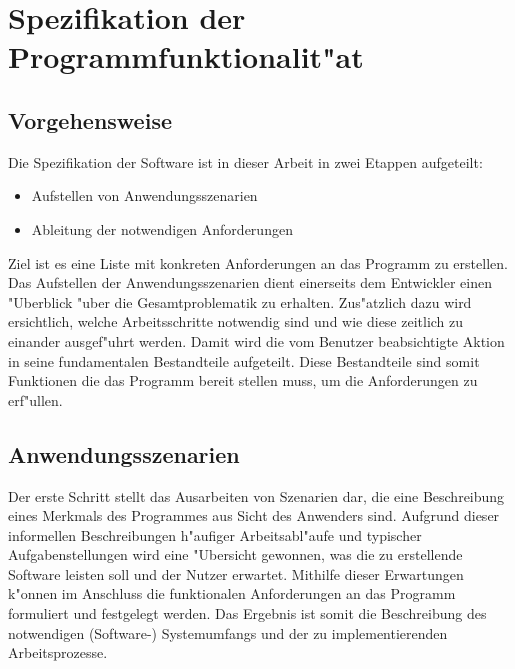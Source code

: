 \chapter{Spezifikation der Programmfunktionalit"at}
\label{chap:spezifikation}

\section{Vorgehensweise}

Die Spezifikation der Software ist in dieser Arbeit in zwei Etappen aufgeteilt:
\begin{itemize}
	\item Aufstellen von Anwendungsszenarien
	\item Ableitung der notwendigen Anforderungen
\end{itemize}
Ziel ist es eine Liste mit konkreten Anforderungen an das Programm zu erstellen.
Das Aufstellen der Anwendungsszenarien dient einerseits dem Entwickler einen "Uberblick "uber die Gesamtproblematik zu erhalten.
Zus"atzlich dazu wird ersichtlich, welche Arbeitsschritte notwendig sind und wie diese zeitlich zu einander ausgef"uhrt werden.
Damit wird die vom Benutzer beabsichtigte Aktion in seine fundamentalen Bestandteile aufgeteilt.
Diese Bestandteile sind somit Funktionen die das Programm bereit stellen muss, um die Anforderungen zu erf"ullen.

\section{Anwendungsszenarien}
\label{sec:anwendungsszenarien}


Der erste Schritt stellt das Ausarbeiten von Szenarien dar, die eine Beschreibung eines Merkmals des Programmes aus Sicht des Anwenders sind.
Aufgrund dieser informellen Beschreibungen h"aufiger Arbeitsabl"aufe und typischer Aufgabenstellungen wird eine "Ubersicht gewonnen, was die zu erstellende Software leisten soll und der Nutzer erwartet.
Mithilfe dieser Erwartungen k"onnen im Anschluss die funktionalen Anforderungen an das Programm formuliert und festgelegt werden.
Das Ergebnis ist somit die Beschreibung des notwendigen (Software-) Systemumfangs und der zu implementierenden Arbeitsprozesse.

